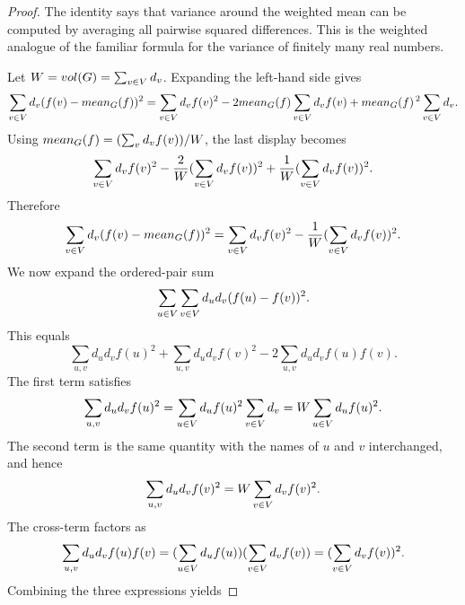 \begin{proof}
	The identity says that variance around the weighted mean can be computed by averaging all pairwise squared differences. This is the weighted analogue of the familiar formula for the variance of finitely many real numbers.

	Let \(W=vol(G)=\sum_{v\in V}d_v\). Expanding the left-hand side gives
	\begin{equation}
		\sum_{v\in V}d_v(f(v)-mean_{G}(f))^2
		=
		\sum_{v\in V}d_v f(v)^2-2mean_{G}(f)\sum_{v\in V}d_v f(v)+mean_{G}(f)^{\,2}\sum_{v\in V}d_v.
	\end{equation}
	Using \(mean_{G}(f)=(\sum_v d_v f(v))/W\), the last display becomes
	\begin{equation}
		\sum_{v\in V}d_v f(v)^2-\frac{2}{W}(\sum_{v\in V}d_v f(v))^2+\frac{1}{W}(\sum_{v\in V}d_v f(v))^2.
	\end{equation}
	Therefore
	\begin{equation}
		\sum_{v\in V}d_v(f(v)-mean_{G}(f))^2
		=
		\sum_{v\in V}d_v f(v)^2-\frac{1}{W}(\sum_{v\in V}d_v f(v))^2.
	\end{equation}
	We now expand the ordered-pair sum
	\begin{equation}
		\sum_{u\in V}\sum_{v\in V}d_ud_v(f(u)-f(v))^2.
	\end{equation}
	This equals
	\begin{equation}
		\sum_{u,v}d_ud_v f(u)^2+\sum_{u,v}d_ud_v f(v)^2-2\sum_{u,v}d_ud_v f(u)f(v).
	\end{equation}
	The first term satisfies
	\begin{equation}
		\sum_{u,v}d_ud_v f(u)^2=\sum_{u\in V}d_u f(u)^2\sum_{v\in V}d_v=W\sum_{u\in V}d_u f(u)^2.
	\end{equation}
	The second term is the same quantity with the names of \(u\) and \(v\) interchanged, and hence
	\begin{equation}
		\sum_{u,v}d_ud_v f(v)^2=W\sum_{v\in V}d_v f(v)^2.
	\end{equation}
	The cross-term factors as
	\begin{equation}
		\sum_{u,v}d_ud_v f(u)f(v)=(\sum_{u\in V}d_u f(u))(\sum_{v\in V}d_v f(v))=(\sum_{v\in V}d_v f(v))^2.
	\end{equation}
	Combining the three expressions yields

\end{proof}
